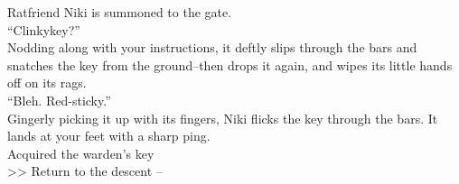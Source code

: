 Ratfriend Niki is summoned to the gate.\\

“Clinkykey?”\\

Nodding along with your instructions, it deftly slips through the bars and snatches the key from the ground--then drops it again, and wipes its little hands off on its rags.\\
“Bleh. Red-sticky.”\\

Gingerly picking it up with its fingers, Niki flicks the key through the bars. It lands at your feet with a sharp ping.\\
 Acquired the warden's key\\

>> Return to the descent -- 